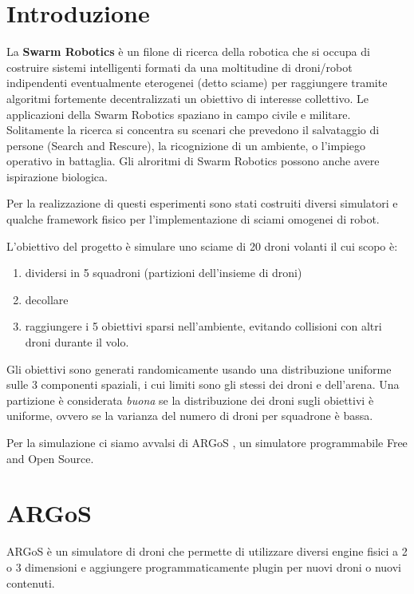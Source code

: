 \documentclass[a4paper,11pt,oneside, table]{article}
\begin{document}
    \printindex
    \tableofcontents
    \renewcommand{\baselinestretch}{1.5}

\section{Introduzione}

La \textbf{Swarm Robotics} \`e un filone di ricerca della robotica che si occupa di costruire sistemi intelligenti formati da una moltitudine di droni/robot indipendenti eventualmente eterogenei (detto sciame) per raggiungere tramite algoritmi fortemente decentralizzati un obiettivo di interesse collettivo.
Le applicazioni della Swarm Robotics spaziano in campo civile e militare.
Solitamente la ricerca si concentra su scenari che prevedono il salvataggio di persone (Search and Rescure), la ricognizione di un ambiente, o l'impiego operativo in battaglia.
Gli alroritmi di Swarm Robotics possono anche avere ispirazione biologica\cite{mclurkin2005dynamic}.

Per la realizzazione di questi esperimenti sono stati costruiti diversi simulatori e qualche framework fisico per l'implementazione di sciami omogenei di robot.

L'obiettivo del progetto \`e simulare uno sciame di 20 droni volanti il cui scopo \`e:
\begin{enumerate}
  \item dividersi in 5 squadroni (partizioni dell'insieme di droni)
  \item decollare
  \item raggiungere i 5 obiettivi sparsi nell'ambiente, evitando collisioni con altri droni durante il volo.
\end{enumerate}

Gli obiettivi sono generati randomicamente usando una distribuzione uniforme sulle 3 componenti spaziali, i cui limiti sono gli stessi dei droni e dell'arena.
Una partizione \`e considerata \textit{buona} se la distribuzione dei droni sugli obiettivi \`e uniforme, ovvero se la varianza del numero di droni per squadrone \`e bassa.

Per la simulazione ci siamo avvalsi di ARGoS \cite{Pinciroli:SI2012}, un simulatore programmabile Free and Open Source.

\section{ARGoS}

ARGoS \`e un simulatore di droni che permette di utilizzare diversi engine fisici a 2 o 3 dimensioni e aggiungere programmaticamente plugin per nuovi droni o nuovi contenuti.
\end{document}
